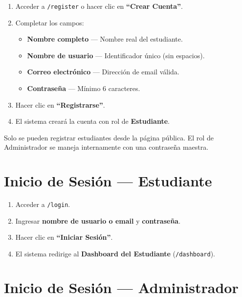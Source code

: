 \documentclass[12pt, a4paper, oneside]{book}
\begin{document}
\begin{stepbox}[title={Pasos para crear una cuenta}]
\begin{enumerate}
    \item Acceder a \texttt{/register} o hacer clic en \textbf{``Crear Cuenta''}.
    \item Completar los campos:
    \begin{itemize}
        \item \textbf{Nombre completo} — Nombre real del estudiante.
        \item \textbf{Nombre de usuario} — Identificador único (sin espacios).
        \item \textbf{Correo electrónico} — Dirección de email válida.
        \item \textbf{Contraseña} — Mínimo 6 caracteres.
    \end{itemize}
    \item Hacer clic en \textbf{``Registrarse''}.
    \item El sistema creará la cuenta con rol de \textbf{Estudiante}.
\end{enumerate}
\end{stepbox}

\begin{notabox}
    Solo se pueden registrar estudiantes desde la página pública. El rol de Administrador se maneja internamente con una contraseña maestra.
\end{notabox}

\section{Inicio de Sesión — Estudiante}

\begin{stepbox}[title={Pasos para iniciar sesión}]
\begin{enumerate}
    \item Acceder a \texttt{/login}.
    \item Ingresar \textbf{nombre de usuario o email} y \textbf{contraseña}.
    \item Hacer clic en \textbf{``Iniciar Sesión''}.
    \item El sistema redirige al \textbf{Dashboard del Estudiante} (\texttt{/dashboard}).
\end{enumerate}
\end{stepbox}

\section{Inicio de Sesión — Administrador}
\end{document}
